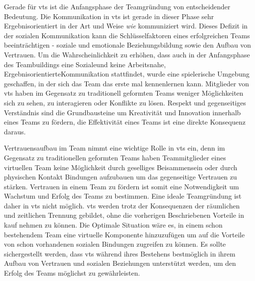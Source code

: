 \documentclass[a4paper,11pt]{article}%
\renewcommand{\\}{\vspace*{0.5\baselineskip} \newline}
\begin{document}

Gerade für \ac{vts} ist die Anfangsphase der Teamgründung von entscheidender Bedeutung. 
Die Kommunikation in \ac{vts} ist gerade in dieser Phase sehr Ergebnisorientiert in der Art und Weise \textit{wie} kommuniziert wird. Dieses Defizit in der sozialen Kommunikation kann die Schlüsselfaktoren eines erfolgreichen Teams beeinträchtigen - soziale und emotionale Beziehungsbildung sowie den Aufbau von Vertrauen. \citep[p.378]{ren2007applying} \\
Um die Wahrscheinlichkeit zu erhöhen, dass auch in der Anfangsphase des Teambuildings eine \glqq Soziale\grqq und keine \glqq Arbeitsnahe, Ergebnisorientierte\grqq Kommunikation stattfindet, wurde eine spielerische Umgebung geschaffen, in der sich das Team das erste mal kennenlernen kann. 
Mitglieder von \ac{vts} haben im Gegensatz zu traditionell geformten Teams weniger Möglichkeiten sich zu sehen, zu interagieren oder Konflikte zu lösen. 
Respekt und gegenseitiges Verständnis sind die Grundbausteine um Kreativität und Innovation innerhalb eines Teams zu fördern, die Effektivität eines Teams ist eine direkte Konsequenz daraus.

Vertrauensaufbau im Team nimmt eine wichtige Rolle in \ac{vts} ein, denn im Gegensatz zu traditionellen geformten Teams haben Teammitglieder eines virtuellen Team keine Möglichkeit durch geselliges Beisammensein oder durch physischen Kontakt Bindungen aufzubauen um das gegenseitige Vertrauen zu stärken.\citep{TrustAndTheVirtualOrganisation}  \\
Vertrauen in einem Team zu fördern ist somit eine Notwendigkeit um Wachstum und Erfolg des Teams zu bestimmen. 
\citep{glacel1997teamwork} \\
Eine ideale Teamgründung ist daher in \ac{vts} nicht möglich. 
\ac{vts} werden trotz der Konsequenzen der räumlichen und zeitlichen Trennung gebildet, ohne die vorherigen Beschriebenen Vorteile in kauf nehmen zu können. Die Optimale Situation wäre es, in einem schon bestehendem Team eine virtuelle Komponente hinzuzufügen um auf die Vorteile von schon vorhandenen sozialen Bindungen zugreifen zu können. \citep[p.36-37]{holton2001building}
Es sollte sichergestellt werden, dass \ac{vts} während ihres Bestehens bestmöglich in ihrem Aufbau von Vertrauen und sozialen Beziehungen unterstützt werden, um den Erfolg des Teams möglichst zu gewährleisten.
\end{document}
